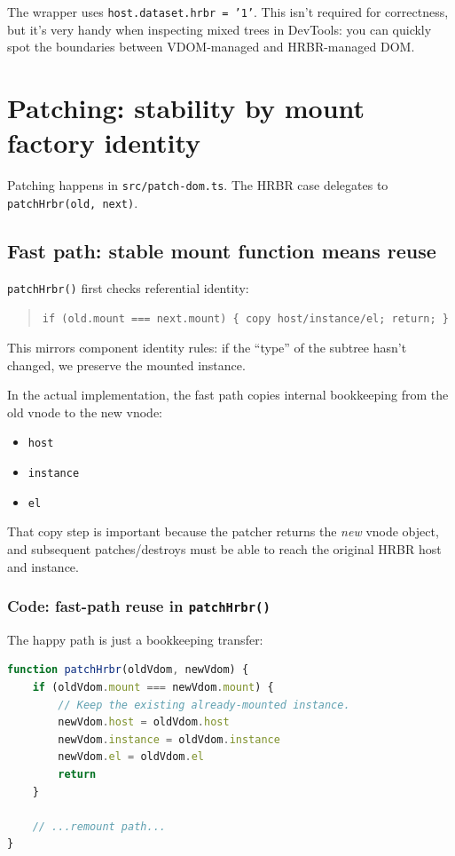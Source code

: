 The wrapper uses \texttt{host.dataset.hrbr = '1'}. This isn't required for correctness, but it's very handy when inspecting mixed trees in DevTools: you can quickly spot the boundaries between VDOM-managed and HRBR-managed DOM.

\section{Patching: stability by mount factory identity}

Patching happens in \texttt{src/patch-dom.ts}. The HRBR case delegates to \texttt{patchHrbr(old, next)}.

\subsection{Fast path: stable mount function means reuse}

\texttt{patchHrbr()} first checks referential identity:

\begin{quote}
\texttt{if (old.mount === next.mount) \{ copy host/instance/el; return; \}}
\end{quote}

This mirrors component identity rules: if the ``type'' of the subtree hasn't changed, we preserve the mounted instance.

In the actual implementation, the fast path copies internal bookkeeping from the old vnode to the new vnode:

\begin{itemize}
\item \texttt{host}
\item \texttt{instance}
\item \texttt{el}
\end{itemize}

That copy step is important because the patcher returns the \emph{new} vnode object, and subsequent patches/destroys must be able to reach the original HRBR host and instance.

\subsubsection*{Code: fast-path reuse in \texttt{patchHrbr()}}

The happy path is just a bookkeeping transfer:

\begin{lstlisting}[language=JavaScript]
function patchHrbr(oldVdom, newVdom) {
	if (oldVdom.mount === newVdom.mount) {
		// Keep the existing already-mounted instance.
		newVdom.host = oldVdom.host
		newVdom.instance = oldVdom.instance
		newVdom.el = oldVdom.el
		return
	}

	// ...remount path...
}
\end{lstlisting}

